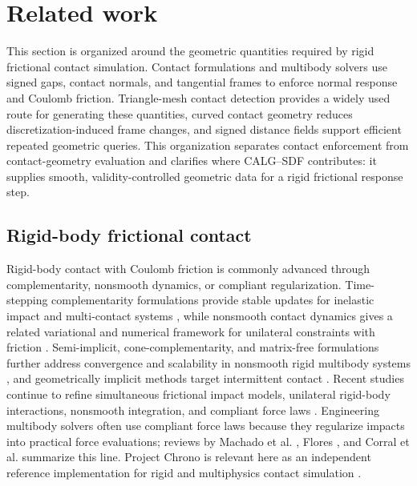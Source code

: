 \documentclass[preprint,12pt]{elsarticle}
\newcommand{\calg}{\textsc{CALG}}
\begin{document}
\section{Related work}
\label{sec:related}

This section is organized around the geometric quantities required by rigid frictional contact simulation. Contact formulations and multibody solvers use signed gaps, contact normals, and tangential frames to enforce normal response and Coulomb friction. Triangle-mesh contact detection provides a widely used route for generating these quantities, curved contact geometry reduces discretization-induced frame changes, and signed distance fields support efficient repeated geometric queries. This organization separates contact enforcement from contact-geometry evaluation and clarifies where \calg{}--SDF contributes: it supplies smooth, validity-controlled geometric data for a rigid frictional response step.

\subsection{Rigid-body frictional contact}

Rigid-body contact with Coulomb friction is commonly advanced through complementarity, nonsmooth dynamics, or compliant regularization. Time-stepping complementarity formulations provide stable updates for inelastic impact and multi-contact systems \cite{stewart1996,anitescu1997}, while nonsmooth contact dynamics gives a related variational and numerical framework for unilateral constraints with friction \cite{jean1999,acary2008}. Semi-implicit, cone-complementarity, and matrix-free formulations further address convergence and scalability in nonsmooth rigid multibody systems \cite{gavrea2008,anitescu2010,tasora2011}, and geometrically implicit methods target intermittent contact \cite{chakraborty2014}. Recent studies continue to refine simultaneous frictional impact models, unilateral rigid-body interactions, nonsmooth integration, and compliant force laws \cite{halm2024setvalued,solanillas2024unilateral,luo2024symplectic,chen2024contactforce}. Engineering multibody solvers often use compliant force laws because they regularize impacts into practical force evaluations; reviews by Machado et al. \cite{machado2012}, Flores \cite{flores2021}, and Corral et al. \cite{corral2021} summarize this line. Project Chrono is relevant here as an independent reference implementation for rigid and multiphysics contact simulation \cite{tasora2016}.
\end{document}
